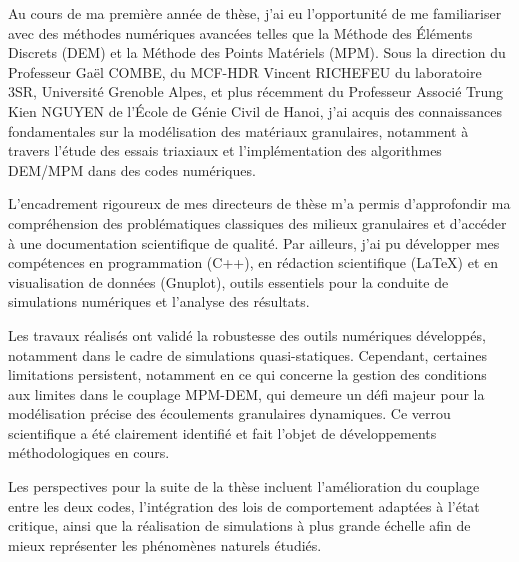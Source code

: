 \documentclass[a4paper,12pt]{report}
\begin{document}
Au cours de ma première année de thèse, j’ai eu l’opportunité de me familiariser avec des méthodes numériques avancées telles que la Méthode des Éléments Discrets (DEM) et la Méthode des Points Matériels (MPM).  
Sous la direction du Professeur Gaël COMBE, du MCF-HDR Vincent RICHEFEU du laboratoire 3SR, Université Grenoble Alpes, et plus récemment du Professeur Associé Trung Kien NGUYEN de l’École de Génie Civil de Hanoi, j’ai acquis des connaissances fondamentales sur la modélisation des matériaux granulaires, notamment à travers l’étude des essais triaxiaux et l’implémentation des algorithmes DEM/MPM dans des codes numériques.

L’encadrement rigoureux de mes directeurs de thèse m’a permis d’approfondir ma compréhension des problématiques classiques des milieux granulaires et d’accéder à une documentation scientifique de qualité. Par ailleurs, j’ai pu développer mes compétences en programmation (C++), en rédaction scientifique (LaTeX) et en visualisation de données (Gnuplot), outils essentiels pour la conduite de simulations numériques et l’analyse des résultats.

Les travaux réalisés ont validé la robustesse des outils numériques développés, notamment dans le cadre de simulations quasi-statiques. Cependant, certaines limitations persistent, notamment en ce qui concerne la gestion des conditions aux limites dans le couplage MPM-DEM, qui demeure un défi majeur pour la modélisation précise des écoulements granulaires dynamiques. Ce verrou scientifique a été clairement identifié et fait l’objet de développements méthodologiques en cours.

Les perspectives pour la suite de la thèse incluent l’amélioration du couplage entre les deux codes, l’intégration des lois de comportement adaptées à l’état critique, ainsi que la réalisation de simulations à plus grande échelle afin de mieux représenter les phénomènes naturels étudiés.




\end{document}
